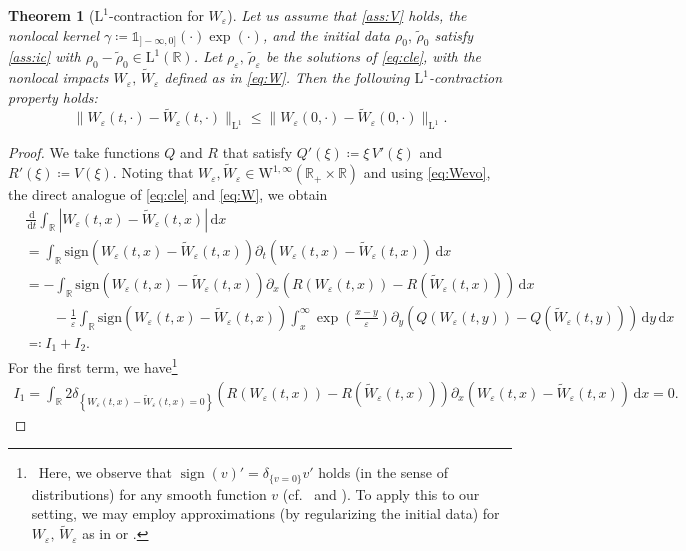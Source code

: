\documentclass[10pt]{amsart}
\theoremstyle{plain}
\newtheorem{theorem}[lemma]{Theorem}
\theoremstyle{definition}
\numberwithin{equation}{section}
\newcommand{\R}{\mathbb{R}}
\newcommand{\eps}{{\varepsilon}}
\newcommand{\sgn}[1]{\mathrm{sign}\left(#1\right)}
\newcommand{\dx}{{\, \mathrm{d}x}}
\newcommand{\dd}{\,\mathrm{d}}
\begin{document}
\begin{theorem}[$\mathrm{L}^1$-contraction for $W_\eps$]\label{th:L1.contr}
Let us assume that \cref{ass:V} holds, the nonlocal kernel $\gamma \coloneqq \mathds{1}_{]-\infty,0]}(\cdot) \exp(\cdot)$, and the initial data $\rho_0,\, \widetilde{\rho}_0$ satisfy \cref{ass:ic} with $\rho_0-\widetilde{\rho}_0\in\mathrm{L}^1(\R)$. Let $\rho_\eps, \, \widetilde{\rho}_\varepsilon$ be the solutions of \cref{eq:cle}, with the nonlocal impacts $W_\eps,\, \widetilde{W}_\varepsilon$ defined as in \cref{eq:W}.
Then the following $\mathrm{L}^1$-contraction property holds: 
\[
\|W_\varepsilon(t,\cdot) - \widetilde{W}_\varepsilon(t,\cdot)\|_{\mathrm{L}^1} \le \|W_\eps(0,\cdot) - \widetilde{W}_\eps(0,\cdot)\|_{\mathrm{L}^1}.
\]
\end{theorem}

\begin{proof}
We take functions $Q$ and $R$ that satisfy $Q'(\xi)\coloneqq\xi\, V'(\xi)$ and $R'(\xi)\coloneqq V(\xi)$.
Noting that $W_\eps,\widetilde{W}_\eps \in \mathrm{W}^{1,\infty}(\R_+\times\R)$ and using \cref{eq:Wevo}, the direct analogue of \cref{eq:cle} and \cref{eq:W}, we obtain
\begin{align*}
    &\frac{\dd}{\dd t} \int_{\mathbb{R}} \left|W_\eps(t,x)-\widetilde{W}_\eps(t,x)\right|\dx \\
    &= \int_{\mathbb{R}} \sgn{W_\eps(t,x)-\widetilde{W}_\eps(t,x)} \partial_t \left( W_\eps(t,x)-\widetilde{W}_\eps(t,x) \right) \dx \\
    &= -\int_{\mathbb{R}} \sgn{W_\eps(t,x)-\widetilde{W}_\eps(t,x)} \partial_x \left( R(W_\eps(t,x)) - R(\widetilde{W}_\eps(t,x)) \right) \dx \\
    &\qquad -\frac1\eps \int_{\mathbb{R}} \sgn{W_\eps(t,x)-\widetilde{W}_\eps(t,x)} \int_x^\infty \exp\left(\frac{x-y}{\eps}\right) \partial_y \left( Q(W_\eps(t,y)) - Q(\widetilde{W}_\eps(t,y)) \right) \dd y \dx \\
    &\eqqcolon I_1+I_2.
\end{align*}
For the first term, we have\footnote{~Here, we observe that $\operatorname{sign}(v)' = \delta_{\{v=0\}}v'$ holds (in the sense of distributions) for any smooth function $v$ (cf.~\cite[Lemma 2]{MR542510} and \cite[Remark 7.1]{MR4789921}). To apply this to our setting, we may employ approximations (by regularizing the initial data) for $W_\eps,\,\widetilde{W}_\eps$ as in \cite[Theorem 3.1]{MR4651679} or \cite[Lemma 3.1]{MR4855163}.}
\begin{align*}
    I_1 = \int_{\mathbb{R}} 2\delta_{\left\{W_\eps(t,x)-\widetilde{W}_\eps(t,x) = 0\right\}} \left( R(W_\eps(t,x)) - R(\widetilde{W}_\eps(t,x)) \right) \partial_x\left( W_\eps(t,x) - \widetilde{W}_\eps(t,x) \right) \dx = 0.

\end{align*}
\end{proof}
\end{document}

